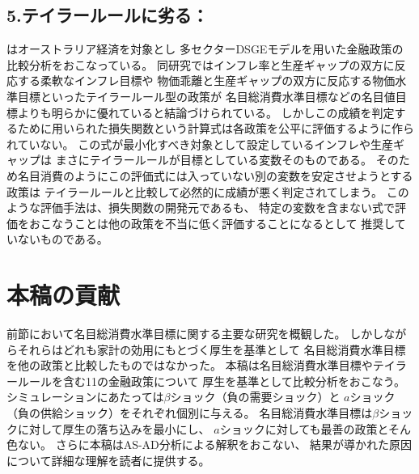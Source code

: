\subsection{5.テイラールールに劣る：\textcite{Gross2023}}
\label{sec:review_gross_2023}
\textcite{Gross2023}はオーストラリア経済を対象とし
多セクターDSGEモデルを用いた金融政策の比較分析をおこなっている。
同研究ではインフレ率と生産ギャップの双方に反応する柔軟なインフレ目標や
物価乖離と生産ギャップの双方に反応する物価水準目標といったテイラールール型の政策が
名目総消費水準目標などの名目値目標よりも明らかに優れていると結論づけられている。
しかしこの成績を判定するために用いられた損失関数という計算式は各政策を公平に評価するように作られていない。
この式が最小化すべき対象として設定しているインフレや生産ギャップは
まさにテイラールールが目標としている変数そのものである。
そのため名目消費のようにこの評価式には入っていない別の変数を安定させようとする政策は
テイラールールと比較して必然的に成績が悪く判定されてしまう。
このような評価手法は、損失関数の開発元である\textcite{DorichMendesZhang2021}も、
特定の変数を含まない式で評価をおこなうことは他の政策を不当に低く評価することになるとして
推奨していないものである。

\section{本稿の貢献}
\label{sec:review_our_contribution}
前節において名目総消費水準目標に関する主要な研究を概観した。
しかしながらそれらはどれも家計の効用にもとづく厚生を基準として
名目総消費水準目標を他の政策と比較したものではなかった。
本稿は名目総消費水準目標やテイラールールを含む11の金融政策について
厚生を基準として比較分析をおこなう。
シミュレーションにあたっては\(\beta\)ショック（負の需要ショック）と
 \(a\)ショック（負の供給ショック）をそれぞれ個別に与える。
名目総消費水準目標は\(\beta\)ショックに対して厚生の落ち込みを最小にし、
 \(a\)ショックに対しても最善の政策とそん色ない。
さらに本稿はAS-AD分析による解釈をおこない、
結果が導かれた原因について詳細な理解を読者に提供する。